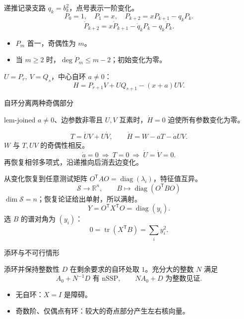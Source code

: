 \documentclass{beamer}
\begin{document}
\begin{frame}{递推记录支路}
$q_k=b_k^2$，点号表示一阶变化。
\[P_0=1,\quad P_1=x,\quad P_{k+2}=xP_{k+1}-q_kP_k.\]
\[\dot P_{k+2}=x\dot P_{k+1}-\dot q_kP_k-q_k\dot P_k.\]
\begin{itemize}\item $P_m$ 首一，奇偶性为 $m$。
\item 当 $m\geq2$ 时，$\deg\dot P_m\leq m-2$；初始变化为零。
\end{itemize}
$U=P_r,\ V=Q_s$，中心自环 $a\ne0$：
\[H=P_{r+1}V+UQ_{s+1}-(x+a)UV.\]
\end{frame}

\begin{frame}{自环分离两种奇偶部分}
\begin{bookresult}{lem-joined}
$a\ne0$、边参数非零且 $U,V$ 互素时，$\dot H=0$ 迫使所有参数变化为零。
\end{bookresult}
\[ T=\dot UV+U\dot V,\qquad \dot H=W-aT-\dot aUV.\]
$W$ 与 $T,UV$ 的奇偶性相反。
\[\dot a=0\ \Longrightarrow\ T=0\ \Longrightarrow\ \dot U=\dot V=0.\]
再恢复相邻多项式，沿递推向后消去边变化。
\end{frame}

\begin{frame}{从变化恢复到任意测试矩阵}
$O^{\mathsf T}AO=\operatorname{diag}(\lambda_i)$，特征值互异。
\[
\mathcal S\longrightarrow\mathbb R^n,\qquad B\longmapsto\operatorname{diag}(O^{\mathsf T}BO)
\]
$\dim\mathcal S=n$；恢复论证给出单射，所以满射。
\[Y=O^{\mathsf T}X^{\mathsf T}O=\operatorname{diag}(y_i).\]
选 $B$ 的谱对角为 $(y_i)$：
\[0=\operatorname{tr}(X^{\mathsf T}B)=\sum_i y_i^2.\]
\end{frame}

\begin{frame}{添环与不可行情形}
\begin{block}{添环并保持整数性}
$D$ 在剩余要求的自环处取 $1$。充分大的整数 $N$ 满足
\[ A_0+N^{-1}D\text{ 有 nSSP},\qquad NA_0+D\text{ 为整数见证}.\]
\end{block}
\begin{itemize}\item 无自环：$X=I$ 是障碍。
\item 奇数阶、仅偶点有环：较大的奇点部分产生左右核向量。
\end{itemize}
\end{frame}
\end{document}

